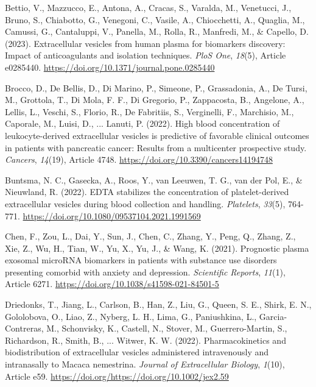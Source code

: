 \documentclass[authordate, empirical]{jote-new-article}
\begin{document}
	Bettio, V., Mazzucco, E., Antona, A., Cracas, S., Varalda, M., Venetucci, J., Bruno, S., Chiabotto, G., Venegoni, C., Vasile, A., Chiocchetti, A., Quaglia, M., Camussi, G., Cantaluppi, V., Panella, M., Rolla, R., Manfredi, M., \& Capello, D. (2023). Extracellular vesicles from human plasma for biomarkers discovery: Impact of anticoagulants and isolation techniques. \emph{PloS One},\emph{ 18}(5), Article e0285440. \href{https://doi.org/10.1371/journal.pone.0285440}{https://doi.org/10.1371/journal.pone.0285440}



	Brocco, D., De Bellis, D., Di Marino, P., Simeone, P., Grassadonia, A., De Tursi, M., Grottola, T., Di Mola, F. F., Di Gregorio, P., Zappacosta, B., Angelone, A., Lellis, L., Veschi, S., Florio, R., De Fabritiis, S., Verginelli, F., Marchisio, M., Caporale, M., Luisi, D., ... Lanuti, P. (2022). High blood concentration of leukocyte-derived extracellular vesicles is predictive of favorable clinical outcomes in patients with pancreatic cancer: Results from a multicenter prospective study. \emph{Cancers},\emph{ 14}(19), Article 4748. \href{https://doi.org/10.3390/cancers14194748}{https://doi.org/10.3390/cancers14194748}



	Buntsma, N. C., Gasecka, A., Roos, Y., van Leeuwen, T. G., van der Pol, E., \& Nieuwland, R. (2022). EDTA stabilizes the concentration of platelet-derived extracellular vesicles during blood collection and handling. \emph{Platelets},\emph{ 33}(5), 764-771. \href{https://doi.org/10.1080/09537104.2021.1991569}{https://doi.org/10.1080/09537104.2021.1991569}



	Chen, F., Zou, L., Dai, Y., Sun, J., Chen, C., Zhang, Y., Peng, Q., Zhang, Z., Xie, Z., Wu, H., Tian, W., Yu, X., Yu, J., \& Wang, K. (2021). Prognostic plasma exosomal microRNA biomarkers in patients with substance use disorders presenting comorbid with anxiety and depression. \emph{Scientific Reports},\emph{ 11}(1), Article 6271. \href{https://doi.org/10.1038/s41598-021-84501-5}{https://doi.org/10.1038/s41598-021-84501-5}



	Driedonks, T., Jiang, L., Carlson, B., Han, Z., Liu, G., Queen, S. E., Shirk, E. N., Gololobova, O., Liao, Z., Nyberg, L. H., Lima, G., Paniushkina, L., Garcia-Contreras, M., Schonvisky, K., Castell, N., Stover, M., Guerrero-Martin, S., Richardson, R., Smith, B., ... Witwer, K. W. (2022). Pharmacokinetics and biodistribution of extracellular vesicles administered intravenously and intranasally to Macaca nemestrina. \emph{Journal of Extracellular Biology},\emph{ 1}(10), Article e59. \href{https://doi.org/https://doi.org/10.1002/jex2.59}{https://doi.org/https://doi.org/10.1002/jex2.59}
\end{document}
